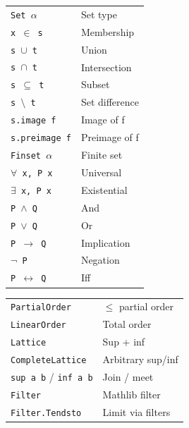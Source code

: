 \documentclass[10pt]{extarticle}
\begin{document}
\begin{multicols}{2}
\begin{tabularx}{\linewidth}{@{}l@{\enspace}Y@{}}
\texttt{Set $\alpha$}               & Set type \\
\texttt{x $\in$ s}                  & Membership \\
\texttt{s $\cup$ t}                 & Union \\
\texttt{s $\cap$ t}                 & Intersection \\
\texttt{s $\subseteq$ t}            & Subset \\
\texttt{s $\setminus$ t}            & Set difference \\
\texttt{s.image f}                   & Image of f \\
\texttt{s.preimage f}               & Preimage of f \\
\texttt{Finset $\alpha$}            & Finite set \\
\texttt{$\forall$ x, P x}          & Universal \\
\texttt{$\exists$ x, P x}          & Existential \\
\texttt{P $\land$ Q}               & And \\
\texttt{P $\lor$ Q}                & Or \\
\texttt{P $\to$ Q}                 & Implication \\
\texttt{$\neg$ P}                  & Negation \\
\texttt{P $\leftrightarrow$ Q}     & Iff \\
\end{tabularx}

\begin{tabularx}{\linewidth}{@{}l@{\enspace}Y@{}}
\texttt{PartialOrder}         & $\le$ partial order \\
\texttt{LinearOrder}          & Total order \\
\texttt{Lattice}              & Sup + inf \\
\texttt{CompleteLattice}      & Arbitrary sup/inf \\
\texttt{sup a b} / \texttt{inf a b}  & Join / meet \\
\texttt{Filter}               & Mathlib filter \\
\texttt{Filter.Tendsto}       & Limit via filters \\
\end{tabularx}


\end{multicols}
\end{document}
